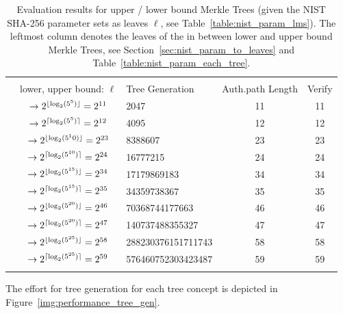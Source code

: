 \begin{table}
\centering
\begin{tabular}{c c l c c} 
 \hline\noalign{\smallskip}
 \multicolumn{5}{c}{\textbf{Evaluation Results NIST: Lower / Upper Bound Merkle Tree}} \\
 \noalign{\smallskip} 
 & lower, upper bound: $\ell$ & Tree Generation & Auth.path Length & Verify \\
 \hline\noalign{\smallskip}
 \multirow{2}{*}{$5^5$} & $\rightarrow 2^{\lfloor\log_2(5^5)\rfloor} = 2^{11} $ & 2047 & 11 & 11 \\
 & $\rightarrow 2^{\lceil\log_2(5^5)\rceil} = 2^{12}$ & 4095 & 12 & 12 \\
 \hline\noalign{\smallskip} 
 \multirow{2}{*}{$5^{10}$} & $\rightarrow 2^{\lfloor\log_2(5^10)\rfloor} = 2^{23}$ & 8388607 & 23 & 23 \\
 & $\rightarrow 2^{\lceil\log_2(5^{10})\rceil} = 2^{24}$ & 16777215 & 24 & 24 \\
 \hline\noalign{\smallskip} 
 \multirow{2}{*}{$5^{15}$}& $\rightarrow 2^{\lfloor\log_2(5^{15})\rfloor} = 2^{34}$ & 17179869183 & 34 & 34 \\ 
 & $\rightarrow 2^{\lceil\log_2(5^{15})\rceil} = 2^{35}$ & 34359738367 & 35 & 35 \\ 
 \hline\noalign{\smallskip} 
 \multirow{2}{*}{$5^{20}$} & $\rightarrow 2^{\lfloor\log_2(5^{20})\rfloor} = 2^{46}$ & 70368744177663 & 46 & 46 \\ 
 & $\rightarrow 2^{\lceil\log_2(5^{20})\rceil} = 2^{47}$ & 140737488355327 & 47 & 47 \\
 \hline\noalign{\smallskip}  
  \multirow{2}{*}{$5^{25}$} & $\rightarrow 2^{\lfloor\log_2(5^{25})\rfloor} =  2^{58}$ & 288230376151711743 & 58 & 58 \\ 
 & $\rightarrow 2^{\lceil\log_2(5^{25})\rceil} = 2^{59}$ & 576460752303423487 & 59 & 59 \\
 \hline\noalign{\smallskip}
 \end{tabular}
\caption{Evaluation results for upper / lower bound Merkle Trees (given the NIST SHA-256 parameter sets as leaves $\ell$, see Table~\ref{table:nist_param_lms}). The leftmost column denotes the leaves of the \extree in between lower and upper bound Merkle Trees, see Section~\ref{sec:nist_param_to_leaves} and Table~\ref{table:nist_param_each_tree}.}
\label{table:eval_upper_lower_bound_nist}
\end{table}

The effort for tree generation for each tree concept is depicted in Figure~\ref{img:performance_tree_gen}.

